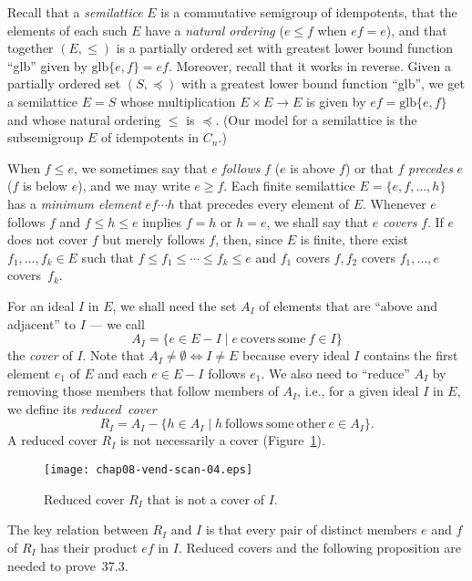 \documentclass{surv-l}
\numberwithin{equation}{section}
\numberwithin{table}{section}
\numberwithin{figure}{section}
\theoremstyle{definition}
\begin{document}
Recall that a \emph{semilattice} $E$ is a commutative semigroup of
idempotents, that the elements of each such $E$ have a
\emph{natural ordering} ($e\leq f$ when $ef =e$), and that
together $(E, \leq)$ is a partially ordered set with greatest
lower bound function ``glb'' given by $\mathrm{glb}\{e, f\}=ef$.
Moreover, recall that it works in reverse. Given a partially
ordered set $(S, \preceq)$ with a greatest lower bound function
``glb'', we get a semilattice $E=S$ whose multiplication $E\times
E\rightarrow E$ is given by $ef=\mathrm{glb}\{e, f\}$ and whose
natural ordering $\leq$ is $\preceq$. (Our model for a semilattice
is the subsemigroup $E$ of idempotents in $C_{n}.$)

When $f\leq e$, we sometimes say that $e$ \emph{follows} $f$ ($e$
is above $f$) or that $f$ \emph{precedes} $e$ ($f$ is below $e$),
and we may write $e\geq f$. Each finite semilattice $E=\{e,
f,\ldots, h\}$ has a \emph{minimum element} $ef\cdots h$ that
precedes every element of $E$. Whenever $e$ follows $f$ and $f\leq
h\leq e$ implies $f=h$ or $h=e$, we shall say that $e$
\emph{covers} $f$. If $e$ does not cover $f$ but merely follows
$f$, then, since $E$ is finite, there exist $f_{1},\ldots,f_{k}\in
E$ such that $f\leq f_{1}\leq\cdots\leq f_{k}\leq e$ and $f_{1}$
covers $f, f_{2}$ covers $f_{1},\ldots, e$ covers~$f_{k}$.

For an ideal $I$ in $E$, we shall need the set $A_{I}$ of elements
that are ``above and adjacent'' to $I$ --- we call
\[
A_{I}=\{e\in E-I \mid e\ \mathrm{covers\ some}\ f\in I \}
\]
the \emph{cover} of $I$. Note that
$A_{I}\neq\emptyset\Leftrightarrow I \neq E$ because every ideal
$I$ contains the first element $e_{1}$ of $E$ and each $ e\in E-I$
follows $e_{1}$. We also need to ``reduce'' $A_{I}$ by removing
those members that follow members of $A_{I}$, i.e., for a given
ideal $I$ in $E$, we define its \emph{reduced~cover}
\[
R_{I}=A_{I}-\{h\in A_{I}\mid h\ \mathrm{follows\ some\ other}\ e\in A_{I}\}.
\]
A reduced cover $R_{I}$ is not necessarily a cover
(Figure~\ref{fig8.37.1}).

\begin{figure}[!h]
\texttt{[image: chap08-vend-scan-04.eps]}
\caption{Reduced cover $R_{I}$ that is not a cover of $I$.\label{fig8.37.1}}
\end{figure}

The key relation between $R_{I}$ and $I$ is that every pair of
distinct members $e$ and $f$ of $R_{I}$ has their product $ef$ in
$I$. Reduced covers and the following proposition are needed to
prove~37.3.
\end{document}
